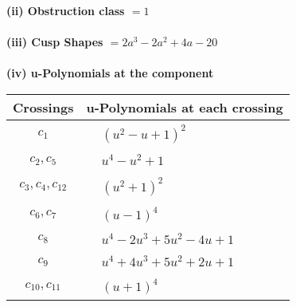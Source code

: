 \documentclass[1p]{elsarticle_modified}
\theoremstyle{definition}
\begin{document}
\flushleft \textbf{(ii) Obstruction class $= 1$}\\~\\
\flushleft \textbf{(iii) Cusp Shapes $= 2 a^3-2 a^2+4 a-20$}\\~\\
\newpage\renewcommand{\arraystretch}{1}
\flushleft \textbf{(iv) u-Polynomials at the component}\newline \\
\begin{tabular}{m{50pt}|m{274pt}}
Crossings & \hspace{64pt}u-Polynomials at each crossing \\
\hline $$\begin{aligned}c_{1}\end{aligned}$$&$\begin{aligned}
&(u^2- u+1)^2
\end{aligned}$\\
\hline $$\begin{aligned}c_{2},c_{5}\end{aligned}$$&$\begin{aligned}
&u^4- u^2+1
\end{aligned}$\\
\hline $$\begin{aligned}c_{3},c_{4},c_{12}\end{aligned}$$&$\begin{aligned}
&(u^2+1)^2
\end{aligned}$\\
\hline $$\begin{aligned}c_{6},c_{7}\end{aligned}$$&$\begin{aligned}
&(u-1)^4
\end{aligned}$\\
\hline $$\begin{aligned}c_{8}\end{aligned}$$&$\begin{aligned}
&u^4-2 u^3+5 u^2-4 u+1
\end{aligned}$\\
\hline $$\begin{aligned}c_{9}\end{aligned}$$&$\begin{aligned}
&u^4+4 u^3+5 u^2+2 u+1
\end{aligned}$\\
\hline $$\begin{aligned}c_{10},c_{11}\end{aligned}$$&$\begin{aligned}
&(u+1)^4
\end{aligned}$\\
\hline
\end{tabular}\\~\\
\end{document}
